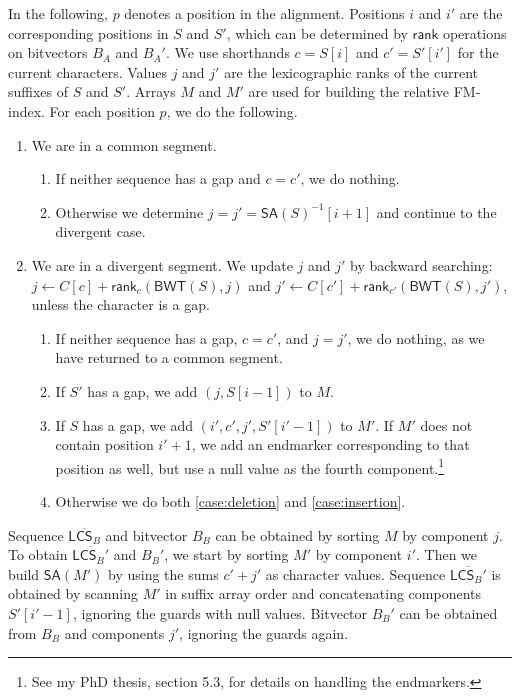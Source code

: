 \documentclass[11pt,a4paper]{article}
\newcommand{\BWT}
  {\ensuremath{\mathsf{BWT}}}
\newcommand{\SA}
  {\ensuremath{\mathsf{SA}}}
\newcommand{\LCS}
  {\ensuremath{\mathsf{LCS}}}
\newcommand{\mrank}{\ensuremath{\mathsf{rank}}}
\begin{document}
In the following, $p$ denotes a position in the alignment. Positions $i$ and $i'$ are the corresponding positions in $S$ and $S'$, which can be determined by $\mrank$ operations on bitvectors $B_{A}$ and $B_{A}'$. We use shorthands $c = S[i]$ and $c' = S'[i']$ for the current characters. Values $j$ and $j'$ are the lexicographic ranks of the current suffixes of $S$ and $S'$. Arrays $M$ and $M'$ are used for building the relative FM-index. For each position $p$, we do the following.

\begin{enumerate}

\item We are in a common segment.
\begin{enumerate}
\item If neither sequence has a gap and $c = c'$, we do nothing.
\item Otherwise we determine $j = j' = \SA(S)^{-1}[i + 1]$ and continue to the divergent case.
\end{enumerate}

\item We are in a divergent segment. We update $j$ and $j'$ by backward searching: $j \leftarrow C[c] + \mrank_{c}(\BWT(S), j)$ and $j' \leftarrow C[c'] + \mrank_{c'}(\BWT(S), j')$, unless the character is a gap.
\begin{enumerate}
\item If neither sequence has a gap, $c = c'$, and $j = j'$, we do nothing, as we have returned to a common segment.
\item If $S'$ has a gap, we add $(j, S[i-1])$ to $M$.\label{case:deletion}
\item If $S$ has a gap, we add $(i', c', j', S'[i'-1])$ to $M'$. If $M'$ does not contain position $i'+1$, we add an endmarker corresponding to that position as well, but use a null value as the fourth component.\footnote{See my PhD thesis, section 5.3, for details on handling the endmarkers.}\label{case:insertion}
\item Otherwise we do both \ref{case:deletion} and \ref{case:insertion}.
\end{enumerate}

\end{enumerate}

Sequence $\overline{\LCS_{B}}$ and bitvector $B_{B}$ can be obtained by sorting $M$ by component $j$. To obtain $\overline{\LCS_{B}'}$ and $B_{B}'$, we start by sorting $M'$ by component $i'$. Then we build $\SA(M')$ by using the sums $c'+j'$ as character values. Sequence $\overline{\LCS_{B}'}$ is obtained by scanning $M'$ in suffix array order and concatenating components $S'[i'-1]$, ignoring the guards with null values. Bitvector $B_{B}'$ can be obtained from $B_{B}$ and components $j'$, ignoring the guards again.
\end{document}
